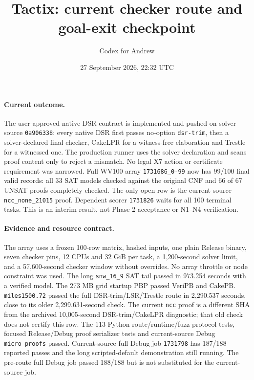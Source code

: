 \documentclass[11pt]{article}
\title{Tactix: current checker route and goal-exit checkpoint}
\author{Codex for Andrew}
\date{27 September 2026, 22:32 UTC}
\begin{document}
\maketitle

\paragraph{Current outcome.}
The user-approved native DSR contract is implemented and pushed on solver
source \texttt{0a906338}: every native DSR first passes no-option
\texttt{dsr-trim}, then a solver-declared final checker, CakeLPR for a
witness-free elaboration and Trestle for a witnessed one. The production runner
uses the solver declaration and scans proof content only to reject a mismatch.
No legal X7 action or certificate requirement was narrowed. Full WV100 array
\texttt{1731686\_0-99} now has 99/100 final valid records: all 33 SAT models
checked against the original CNF and 66 of 67 UNSAT proofs completely checked.
The only open row is the current-source \texttt{ncc\_none\_21015} proof.
Dependent scorer \texttt{1731826} waits for all 100 terminal tasks. This is an
interim result, not Phase 2 acceptance or N1--N4 verification.

\paragraph{Evidence and resource contract.}
The array uses a frozen 100-row matrix, hashed inputs, one plain Release binary,
seven checker pins, 12 CPUs and 32 GiB per task, a 1,200-second solver limit,
and a 57,600-second checker window without overrides. No array throttle or
node constraint was used. The long \texttt{snw\_16\_9} SAT tail passed in
973.254 seconds with a verified model. The 273 MB grid startup PBP passed
VeriPB and CakePB. \texttt{miles1500.72} passed the full DSR-trim/LSR/Trestle
route in 2,290.537 seconds, close to its older 2,299.631-second check. The
current \texttt{ncc} proof is a different SHA from the archived 10,005-second
DSR-trim/CakeLPR diagnostic; that old check does not certify this row. The
113 Python route/runtime/fuzz-protocol tests, focused Release/Debug proof
serializer tests and current-source Debug \texttt{micro\_proofs} passed.
Current-source full Debug job \texttt{1731798} has 187/188 reported passes and
the long scripted-default demonstration still running. The pre-route full
Debug job passed 188/188 but is not substituted for the current-source job.
\end{document}

